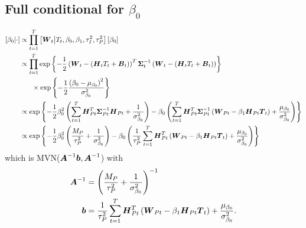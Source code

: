 \documentclass{article}\usepackage[]{graphicx}\usepackage[]{color}
\def\bm#1{\mbox{\boldmath $#1$}}
\begin{document}
\subsection{Full conditional for $\beta_0$}
%
\begin{align*}
%
\left[ \beta_0 \middle| \cdot \right] & \propto \prod_{t = 1}^T \left[ \bm{W}_t \middle| T_t, \beta_0, \beta_1, \tau^2_I, \tau^2_P \right] \left[ \beta_0 \right]\\
%
& \propto \prod_{t = 1}^T \exp{ \left\{ - \frac{1} {2} \left( \bm{W}_t - \left( \bm{H}_t T_t + \bm{B}_t \right) \right)^T \bm{\Sigma}_t^{ - 1} \left( \bm{W}_t - \left( \bm{H}_t T_t + \bm{B}_t \right) \right) \right\} }\\
& \hspace{6mm} \times \exp{ \left\{ - \frac{1} {2} \frac{ \left( \beta_0 - \mu_{\beta_0} \right)^2 } {\sigma^2_{\beta_0}} \right\} }\\
%
& \propto \exp{ \left\{ - \frac{1} {2} \beta_0^2 \left( \sum_{t = 1}^T \bm{H}_{Pt}^T \bm{\Sigma}_{Pt}^{ - 1} \bm{H}_{Pt} + \frac{1} {\sigma^2_{\beta_0}}  \right) - \beta_0 \left( \sum_{t = 1}^T \bm{H}_{Pt}^T \bm{\Sigma}_{Pt}^{ - 1} \left( \bm{W}_{Pt} - \beta_1 \bm{H}_{Pt} \bm{T}_t \right) + \frac{\mu_{\beta_0}} {\sigma^2_{\beta_0}} \right) \right\} }\\
%
& \propto \exp{ \left\{ - \frac{1} {2} \beta_0^2 \left( \frac{M_P} {\tau^2_P} + \frac{1} {\sigma^2_{\beta_0}} \right) - \beta_0 \left( \frac{1} {\tau^2_P} \sum_{t = 1}^T \bm{H}_{Pt}^T \left( \bm{W}_{Pt} - \beta_1 \bm{H}_{Pt} \bm{T}_t \right) + \frac{\mu_{\beta_0}} {\sigma^2_{\beta_0}} \right) \right\} }\\
%
\end{align*}
%
which is MVN($\bm{A}^{ - 1}\bm{b}, \bm{A}^{ - 1}$) with \\
\begin{align*}
%
\bm{A}^{ - 1} & = \left( \frac{M_P} {\tau^2_P} + \frac{1} {\sigma^2_{\beta_0}} \right)^{ - 1}\\
%
\bm{b} & = \frac{1} {\tau^2_P} \sum_{t = 1}^T \bm{H}_{Pt}^T \left( \bm{W}_{Pt} - \beta_1 \bm{H}_{Pt} \bm{T}_t \right)  + \frac{\mu_{\beta_0}} {\sigma^2_{\beta_0}}.\\
%
\end{align*}
%
%
\end{document}
